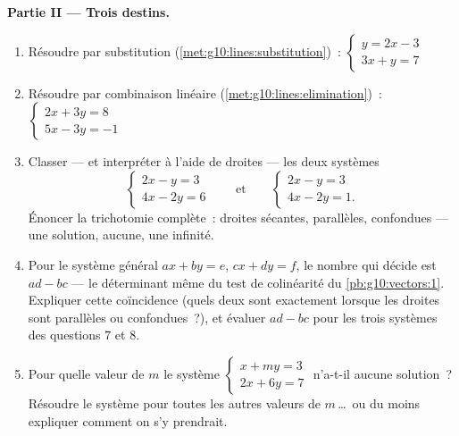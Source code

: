 \begin{problem}
\medskip
\noindent\textbf{Partie II --- Trois destins.}
\begin{enumerate}[resume]
  \item Résoudre par substitution
        (\cref{met:g10:lines:substitution})~:
        $\begin{cases} y = 2x - 3 \\ 3x + y = 7 \end{cases}$
  \item Résoudre par combinaison linéaire
        (\cref{met:g10:lines:elimination})~:
        $\begin{cases} 2x + 3y = 8 \\ 5x - 3y = -1 \end{cases}$
  \item Classer --- et interpréter à l'aide de droites --- les deux
        systèmes
        \[
        \begin{cases} 2x - y = 3 \\ 4x - 2y = 6 \end{cases}
        \qquad\text{et}\qquad
        \begin{cases} 2x - y = 3 \\ 4x - 2y = 1 . \end{cases}
        \]
        Énoncer la trichotomie complète~: droites sécantes,
        parallèles, confondues --- une solution, aucune, une
        infinité.
  \item Pour le système général $ax + by = e$, $cx + dy = f$, le
        nombre qui décide est $ad - bc$ --- le déterminant même du
        test de colinéarité du \cref{pb:g10:vectors:1}. Expliquer
        cette coïncidence (quels deux  sont 
        exactement lorsque les droites sont parallèles ou
        confondues~?), et évaluer $ad - bc$ pour les trois systèmes
        des questions 7 et 8.
  \item Pour quelle valeur de $m$ le système
        $\begin{cases} x + my = 3 \\ 2x + 6y = 7 \end{cases}$
        n'a-t-il aucune solution~? Résoudre le système pour toutes
        les autres valeurs de $m$\,\dots\ ou du moins expliquer
        comment on s'y prendrait.
\end{enumerate}


\end{problem}
